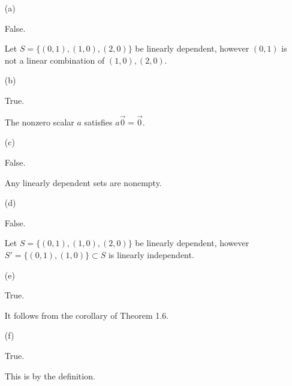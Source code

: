 \begin{Exercise}
	\begin{enumerate}[(a)]
		\item[(a)]
		\begin{answer}
			False.
		\end{answer}
		\begin{solution}
			Let $S = \{(0,1),(1,0),(2,0)\}$ be linearly dependent, however $(0,1)$ is not a linear combination of $(1,0),(2,0)$.
		\end{solution}
		
		\item[(b)]
		\begin{answer}
			True.
		\end{answer}
		\begin{solution}
			The nonzero scalar $a$ satisfies $a\vec{0} = \vec{0}$.
		\end{solution}
		
		\item[(c)]
		\begin{answer}
			False.
		\end{answer}
		\begin{solution}
			Any linearly dependent sets are nonempty.
		\end{solution}
		
		\item[(d)]
		\begin{answer}
			False.
		\end{answer}
		\begin{solution}
			Let $S = \{(0,1),(1,0),(2,0)\}$ be linearly dependent, however $S' = \{(0,1),(1,0)\}\subset S$ is linearly independent.
		\end{solution}
		
		\item[(e)]
		\begin{answer}
			True.
		\end{answer}
		\begin{solution}
			It follows from the corollary of Theorem 1.6.
		\end{solution}
		
		\item[(f)]
		\begin{answer}
			True.
		\end{answer}
		\begin{solution}
			This is by the definition.
		\end{solution}
		
	\end{enumerate}
\end{Exercise}